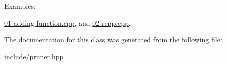 \begin{Desc}
\item[Examples\+: ]\par
\hyperlink{01-adding-function_8cpp-example}{01-\/adding-\/function.\+cpp}, and \hyperlink{02-rcpp_8cpp-example}{02-\/rcpp.\+cpp}.\end{Desc}


The documentation for this class was generated from the following file\+:\begin{DoxyCompactItemize}
\item 
include/pruner.\+hpp\end{DoxyCompactItemize}
